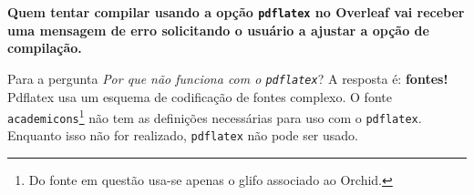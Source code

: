 {\bfseries Quem tentar compilar usando a opção \texttt{pdflatex} no Overleaf vai receber uma mensagem de erro solicitando o usuário a ajustar a opção de compilação.}

Para a pergunta \textit{Por que não funciona com o \texttt{pdflatex}}?  A resposta é: \textbf{fontes!} Pdflatex usa um esquema de codificação de fontes complexo. 
O fonte \texttt{academicons}\footnote{Do fonte em questão usa-se apenas o glifo associado ao Orchid.} não tem as definições necessárias para uso com o \texttt{pdflatex}. Enquanto isso não for realizado, \texttt{pdflatex} não pode ser usado. 
